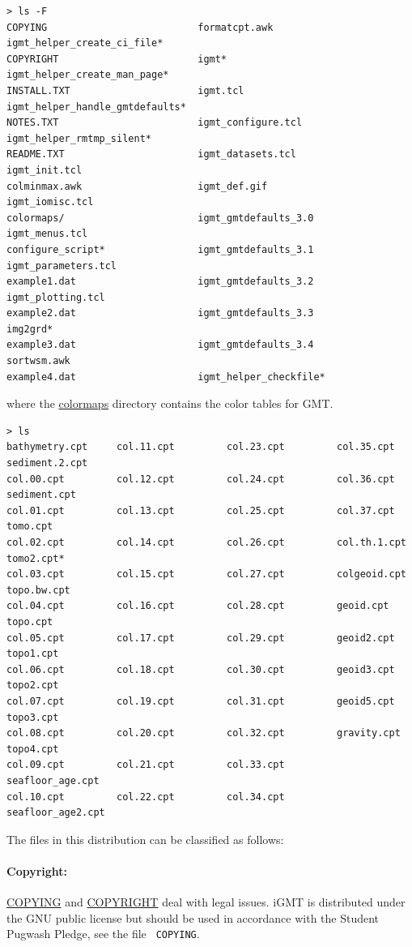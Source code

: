 \documentclass[11pt]{article}
\begin{document}
\begin{verbatim}
> ls -F
COPYING                          formatcpt.awk                    igmt_helper_create_ci_file*
COPYRIGHT                        igmt*                            igmt_helper_create_man_page*
INSTALL.TXT                      igmt.tcl                         igmt_helper_handle_gmtdefaults*
NOTES.TXT                        igmt_configure.tcl               igmt_helper_rmtmp_silent*
README.TXT                       igmt_datasets.tcl                igmt_init.tcl
colminmax.awk                    igmt_def.gif                     igmt_iomisc.tcl
colormaps/                       igmt_gmtdefaults_3.0             igmt_menus.tcl
configure_script*                igmt_gmtdefaults_3.1             igmt_parameters.tcl
example1.dat                     igmt_gmtdefaults_3.2             igmt_plotting.tcl
example2.dat                     igmt_gmtdefaults_3.3             img2grd*
example3.dat                     igmt_gmtdefaults_3.4             sortwsm.awk
example4.dat                     igmt_helper_checkfile*
\end{verbatim}
\normalsize
where the \url{colormaps} directory contains the color tables for GMT.
\footnotesize
\begin{verbatim}
> ls 
bathymetry.cpt     col.11.cpt         col.23.cpt         col.35.cpt         sediment.2.cpt
col.00.cpt         col.12.cpt         col.24.cpt         col.36.cpt         sediment.cpt
col.01.cpt         col.13.cpt         col.25.cpt         col.37.cpt         tomo.cpt
col.02.cpt         col.14.cpt         col.26.cpt         col.th.1.cpt       tomo2.cpt*
col.03.cpt         col.15.cpt         col.27.cpt         colgeoid.cpt       topo.bw.cpt
col.04.cpt         col.16.cpt         col.28.cpt         geoid.cpt          topo.cpt
col.05.cpt         col.17.cpt         col.29.cpt         geoid2.cpt         topo1.cpt
col.06.cpt         col.18.cpt         col.30.cpt         geoid3.cpt         topo2.cpt
col.07.cpt         col.19.cpt         col.31.cpt         geoid5.cpt         topo3.cpt
col.08.cpt         col.20.cpt         col.32.cpt         gravity.cpt        topo4.cpt
col.09.cpt         col.21.cpt         col.33.cpt         seafloor_age.cpt
col.10.cpt         col.22.cpt         col.34.cpt         seafloor_age2.cpt
\end{verbatim}
\normalsize

The files in this distribution can be classified as follows:

\paragraph{Copyright:} \url{COPYING} and \url{COPYRIGHT} deal with legal issues.
iGMT is distributed under the GNU public license but should be used in
accordance with the Student Pugwash Pledge, see the file {\tt
  COPYING}.
\end{document}
